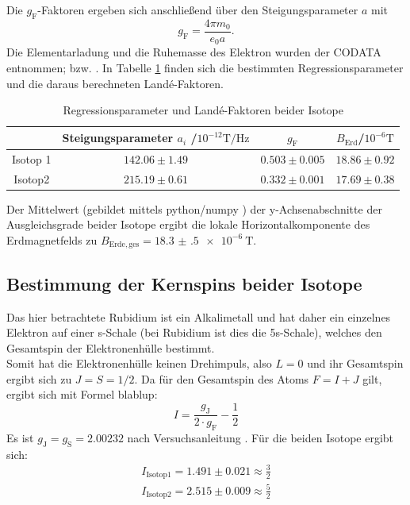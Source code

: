 Die $g_{\mathrm{F}}$-Faktoren ergeben sich anschließend über den Steigungsparameter $a$ mit
\begin{equation*}
  g_{\mathrm{F}}=\frac{4\pi m_0}{e_0 a}\mathrm{.}
\end{equation*}
Die Elementarladung und die Ruhemasse des Elektron wurden der CODATA entnommen; \cite{e} bzw. \cite{m_0}.
In Tabelle \ref{tab:res1} finden sich die bestimmten Regressionsparameter und die daraus berechneten Landé-Faktoren.
\begin{table}
  \caption{Regressionsparameter und Landé-Faktoren beider Isotope}
  \label{tab:res1}
 \centering
 \begin{tabular}{cccc}
   \toprule
&Steigungsparameter $a_i$ /$ 10^{-12}\si{\tesla\per\hertz}$&$g_{\mathrm{F}}$&$B_{\mathrm{Erd}}$/$10^{-6}\si{\tesla}$\\
\midrule
Isotop 1&$142.06\pm1.49$&$0.503\pm0.005$&$18.86\pm0.92$\\
Isotop2&$215.19\pm0.61$&$0.332\pm0.001$ &$17.69\pm0.38$\\
\bottomrule
\end{tabular}
\end{table}
Der Mittelwert (gebildet mittels python/numpy \cite{numpy}) der y-Achsenabschnitte der Ausgleichsgrade beider Isotope ergibt die lokale Horizontalkomponente des Erdmagnetfelds zu $B_{\mathrm{Erde,ges}}=\SI{18.3(5)e-6}{\tesla}$.




\subsection{Bestimmung der Kernspins beider Isotope}
Das hier betrachtete Rubidium ist ein Alkalimetall und hat daher ein einzelnes Elektron auf einer s-Schale (bei Rubidium ist dies die 5s-Schale), welches den Gesamtspin der Elektronenhülle bestimmt.\\
Somit hat die Elektronenhülle keinen Drehimpuls, also $L=0$ und ihr Gesamtspin ergibt sich zu $J=S=1/2$. Da für den Gesamtspin des Atoms $F=I+J$ gilt, ergibt sich mit Formel blablup:
\begin{equation*}
I=\frac{g_{\mathrm{J}}}{2\cdot g_{\mathrm{F}}}-\frac{1}{2}
\end{equation*}
Es ist $g_{\mathrm{J}}=g_{\mathrm{S}}=2.00232$ nach Versuchsanleitung \cite{Anleitung}.
Für die beiden Isotope ergibt sich:
\begin{gather*}
  I_{\mathrm{Isotop 1}}=1.491\pm0.021\approx\frac{3}{2}\\
  I_{\mathrm{Isotop 2}}=2.515\pm0.009\approx\frac{5}{2}\\
\end{gather*}

